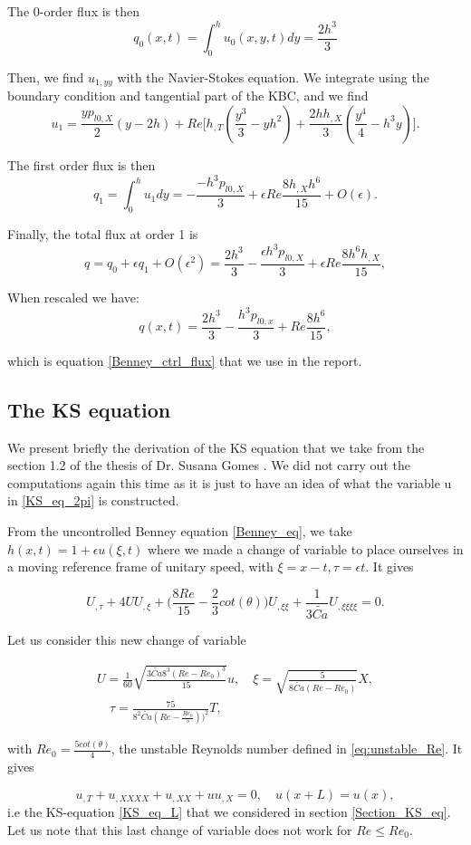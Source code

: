 \documentclass[12pt]{article}
\begin{document}
The 0-order flux is then $$q_0(x,t) = \int_0^h u_0(x,y,t) dy = \frac{2h^3}{3}$$


Then, we find $u_{1,yy}$ with the Navier-Stokes equation. We integrate using the boundary condition and tangential part of the KBC, and we find
$$u_1 =  \frac{yp_{l0,X}}{2}(y-2h)+Re\Big[h_{,T}(\frac{y^3}{3}-yh^2)+ \frac{2hh_{,X}}{3}(\frac{y^4}{4}-h^3y) \Big].$$

The first order flux is then 
\begin{equation}
 q_1 = \int_0^hu_1dy = -\frac{-h^3p_{l0,X}}{3}+\epsilon Re\frac{8h_{,X}h^6}{15}+O(\epsilon).
\end{equation}

Finally, the total flux at order 1 is $$q = q_0 + \epsilon q_1 + O(\epsilon^2) = \frac{2h^3}{3}-\frac{\epsilon h^3 p_{l0,X}}{3}+\epsilon Re\frac{8h^6h_{,X}}{15},$$

When rescaled we have: 
 \begin{equation}
 \boxed{
     q(x,t) = \frac{2h^3}{3}-\frac{h^3p_{l0,x}}{3}+Re\frac{8h^6}{15},}
 \end{equation}

which is equation \eqref{Benney_ctrl_flux} that we use in the report.


\subsection{The KS equation}
We present briefly the derivation of the KS equation that we take from the section 1.2 of the thesis of Dr. Susana Gomes \cite{Susana_thesis}. We did not carry out the computations again this time as it is just to have an idea of what the variable u in \eqref{KS_eq_2pi} is constructed.

From the uncontrolled Benney equation \eqref{Benney_eq}, we take $h(x,t) = 1+\epsilon u(\xi, t)$ where we made a change of variable to place ourselves in a moving reference frame of unitary speed, with $\xi = x-t, \tau = \epsilon t$. It gives

$$U_{,\tau} + 4UU_{,\xi}+\Big( \frac{8Re}{15} - \frac{2}{3}cot(\theta)\Big)U_{,\xi \xi}+\frac{1}{3\tilde{Ca}}U_{,\xi\xi\xi\xi}=0.$$

Let us consider this new change of variable 

\begin{gather}
    U = \frac{1}{60}\sqrt{\frac{3\tilde{Ca}8^3(Re-Re_0)^3}{15}}u , \quad \xi = \sqrt{\frac{5}{8\tilde{Ca}(Re-Re_0)}}X,\\
    \quad \tau = \frac{75}{8^2\tilde{Ca}(Re-\frac{Re_0}{5}))^2}T,
\end{gather}

with $Re_0 = \frac{5cot(\theta)}{4}$, the unstable Reynolds number defined in \eqref{eq:unstable_Re}.
It gives

\begin{equation*}
\boxed{
    u_{,T} + u_{,XXXX}+u_{,XX}+uu_{,X} = 0, \quad u(x+L) =u(x)},
\end{equation*}
i.e the KS-equation \eqref{KS_eq_L} that we considered in section \ref{Section_KS_eq}. Let us note that this last change of variable does not work for $Re\leq Re_0$.
\printbibliography
\end{document}
